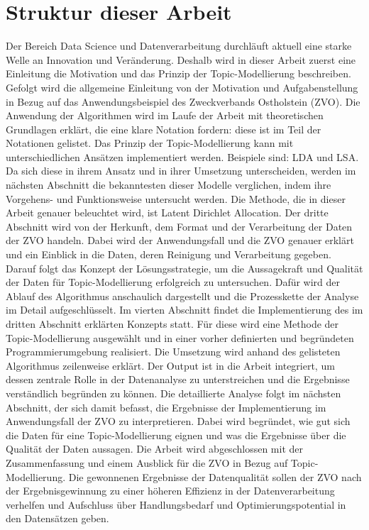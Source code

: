 \documentclass[german,version-2020-11]{uzl-thesis}
\begin{document}
\section{Struktur dieser Arbeit}
Der Bereich Data Science und Datenverarbeitung durchläuft aktuell eine starke Welle an Innovation und Veränderung. Deshalb wird in dieser Arbeit zuerst eine Einleitung die Motivation und das Prinzip der Topic-Modellierung beschreiben. Gefolgt wird die allgemeine Einleitung von der Motivation und Aufgabenstellung in Bezug auf das Anwendungsbeispiel des Zweckverbands Ostholstein (ZVO). Die Anwendung der Algorithmen wird im Laufe der Arbeit mit theoretischen Grundlagen erklärt, die eine klare Notation fordern: diese ist im Teil der Notationen gelistet. Das Prinzip der Topic-Modellierung kann mit unterschiedlichen Ansätzen implementiert werden. Beispiele sind: LDA und LSA. Da sich diese in ihrem Ansatz und in ihrer Umsetzung unterscheiden, werden im nächsten Abschnitt die bekanntesten dieser Modelle verglichen, indem ihre Vorgehens- und Funktionsweise untersucht werden. Die Methode, die in dieser Arbeit genauer beleuchtet wird, ist Latent Dirichlet Allocation. Der dritte Abschnitt wird von der Herkunft, dem Format und der Verarbeitung der Daten der ZVO handeln. Dabei wird der Anwendungsfall und die ZVO genauer erklärt und ein Einblick in die Daten, deren Reinigung und Verarbeitung gegeben. Darauf folgt das Konzept der Lösungsstrategie, um die Aussagekraft und Qualität der Daten für Topic-Modellierung erfolgreich zu untersuchen. Dafür wird der Ablauf des Algorithmus anschaulich dargestellt und die Prozesskette der Analyse im Detail aufgeschlüsselt. Im vierten Abschnitt findet die Implementierung des im dritten Abschnitt erklärten Konzepts statt. Für diese wird eine Methode der Topic-Modellierung ausgewählt und in einer vorher definierten und begründeten Programmierumgebung realisiert. Die Umsetzung wird anhand des gelisteten Algorithmus zeilenweise erklärt. Der Output ist in die Arbeit integriert, um dessen zentrale Rolle in der Datenanalyse zu unterstreichen und die Ergebnisse verständlich begründen zu können. Die detaillierte Analyse folgt im nächsten Abschnitt, der sich damit befasst, die Ergebnisse der Implementierung im Anwendungsfall der ZVO zu interpretieren. Dabei wird begründet, wie gut sich die Daten für eine Topic-Modellierung eignen und was die Ergebnisse über die Qualität der Daten aussagen. Die Arbeit wird abgeschlossen mit der Zusammenfassung und einem Ausblick für die ZVO in Bezug auf Topic-Modellierung. Die gewonnenen Ergebnisse der Datenqualität sollen der ZVO nach der Ergebnisgewinnung zu einer höheren Effizienz in der Datenverarbeitung verhelfen und Aufschluss über Handlungsbedarf und Optimierungspotential in den Datensätzen geben.
\end{document}
